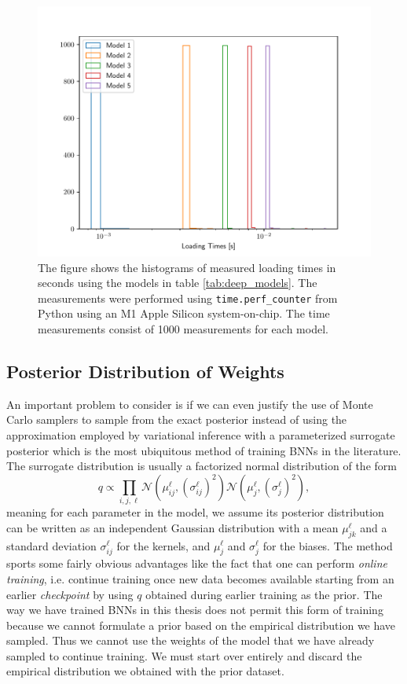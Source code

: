 \begin{figure}
    \centering
    \includegraphics[scale=0.8]{figures/computational_cost/loading_times.pdf}
    \caption{
        The figure shows the histograms of measured loading times in seconds using the models in table \ref{tab:deep_models}. The measurements were performed using {\tt time.perf\_counter} from Python using an M1 Apple Silicon system-on-chip. The time measurements consist of 1000 measurements for each model.
    }
    \label{fig:loading_times}
\end{figure}



\subsection{Posterior Distribution of Weights}
An important problem to consider is if we can even justify the use of Monte Carlo samplers to sample from the exact posterior instead of using the approximation employed by variational inference with a parameterized surrogate posterior which is the most ubiquitous method of training BNNs in the literature. The surrogate distribution is usually a factorized normal distribution of the form
\begin{equation}\label{eq:surrogate_dist}
    q \propto \prod_{i, j, \ell} \mathcal{N}(\mu_{ij}^\ell, (\sigma_{ij}^\ell)^2) \mathcal{N}(\mu_{j}^\ell, (\sigma_{j}^\ell)^2),
\end{equation}
meaning for each parameter in the model, we assume its posterior distribution can be written as an independent Gaussian distribution with a mean $\mu_{jk}^\ell$ and a standard deviation $\sigma_{ij}^\ell$ for the kernels, and $\mu_j^\ell$ and $\sigma_j^\ell$ for the biases. The method sports some fairly obvious advantages like the fact that one can perform \textit{online training}, i.e. continue training once new data becomes available starting from an earlier \textit{checkpoint} by using $q$ obtained during earlier training as the prior. The way we have trained BNNs in this thesis does not permit this form of training because we cannot formulate a prior based on the empirical distribution we have sampled. Thus we cannot use the weights of the model that we have already sampled to continue training. We must start over entirely and discard the empirical distribution we obtained with the prior dataset. 


